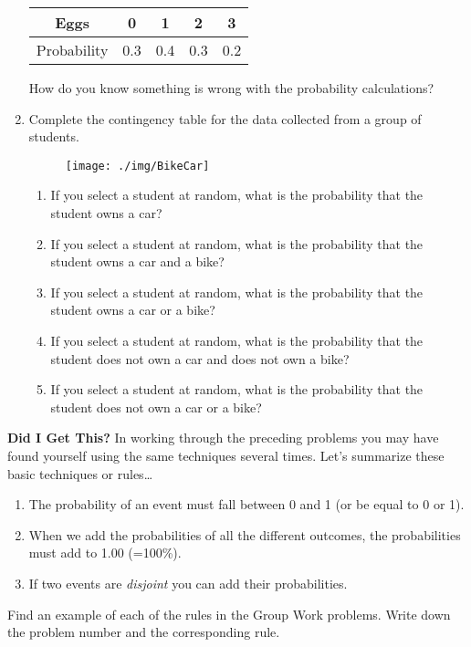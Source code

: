\begin{enumerate}
\begin{table}[H]\centering
\begin{tabular}{|c|c|c|c|c|} \hline
Eggs & 0 & 1 & 2 & 3 \\
\hline
 Probability&0.3& 0.4 & 0.3 & 0.2 \\
\hline
\end{tabular}
\end{table}

How do you know something is wrong with the probability calculations?\\[.5in]

\item Complete the contingency table for the data collected from a group of students.
\begin{figure}[H]
\centering{}\texttt{[image: ./img/BikeCar]} 
\end{figure}

\begin{enumerate}
\item If you select a student at random, what is the probability that the student owns a car?\\[.5cm]
\item If you select a student at random, what is the probability that the student owns a car and a bike?\\[.5cm] 
\item If you select a student at random, what is the probability that the student owns a car or a bike?\\[.5cm]
\item If you select a student at random, what is the probability that the student does not own a car and does not own a bike?\\[.5cm] 
\item If you select a student at random, what is the probability that the student does not own a car or a bike?\\[.5cm] 

\end{enumerate}
\end{enumerate}
\textbf{Did I Get This?} In working through the preceding problems you may have found yourself using the same techniques several times. Let's summarize these basic techniques or rules\dots 
\begin{enumerate}
\item The probability of an event must fall between 0 and 1 (or be equal to 0 or 1).
\item When we add the probabilities of all the different outcomes, the probabilities must add to 1.00 (=100\%).
\item If two events are \emph{disjoint} you can add their probabilities.
\end{enumerate}

Find an example of each of the rules in the Group Work problems. Write down the problem number and the corresponding rule.
